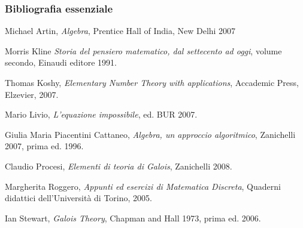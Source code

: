 \documentclass[11pt]{beamer}
\begin{document}
\begin{frame}
\frametitle{Bibliografia essenziale}
\begin{thebibliography}{12}


Michael Artin, \emph{Algebra}, Prentice Hall of India, New Delhi 2007 

Morris Kline \emph{Storia del pensiero matematico, dal settecento ad oggi}, volume secondo, Einaudi editore 1991.

Thomas Koshy, \emph{Elementary Number Theory with applications}, Accademic Press, Elzevier, 2007.

Mario Livio, \emph{L'equazione impossibile}, ed. BUR 2007.

Giulia Maria Piacentini Cattaneo, \emph{Algebra, un approccio algoritmico}, Zanichelli 2007, prima ed. 1996.

Claudio Procesi, \emph{Elementi di teoria di Galois}, Zanichelli 2008.

Margherita Roggero, \emph{Appunti ed esercizi di Matematica Discreta}, Quaderni didattici dell'Università di Torino, 2005.

Ian Stewart, \emph{Galois Theory}, Chapman and Hall 1973, prima ed. 2006.

\end{thebibliography}


\end{frame}
\end{document}
